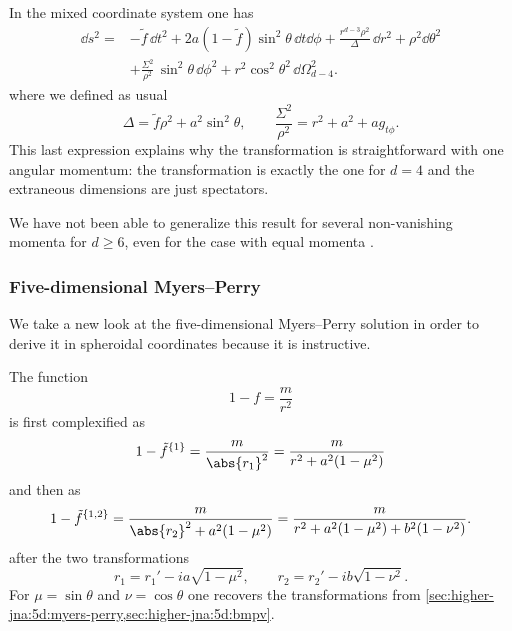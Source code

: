 In the mixed coordinate system one has~\cite{Xu:1988:ExactSolutionsEinstein, Aliev:2006:RotatingBlackHoles}
\begin{equation}
	\begin{aligned}
		\dd s^2 = &- \tilde f\, \dd t^2
			+ 2 a (1 - \tilde f) \sin^2 \theta\, \dd t \dd\phi
			+ \frac{r^{d-3} \rho^2}{\Delta}\, \dd r^2 + \rho^2 \dd\theta^2 \\
			&+ \frac{\Sigma^2}{\rho^2}\, \sin^2 \theta\, \dd\phi^2
			+ r^2 \cos^2 \theta^2\, \dd\Omega_{d-4}^2.
	\end{aligned}
\end{equation} 
where we defined as usual
\begin{equation}
	\Delta = \tilde f \rho^2 + a^2 \sin^2 \theta, \qquad
	\frac{\Sigma^2}{\rho^2} = r^2 + a^2 + a g_{t\phi}.
\end{equation} 
This last expression explains why the transformation is straightforward with one angular momentum: the transformation is exactly the one for $d = 4$ and the extraneous dimensions are just spectators.

We have not been able to generalize this result for several non-vanishing momenta for $d \ge 6$, even for the case with equal momenta .


\subsubsection{Five-dimensional Myers--Perry}
\label{sec:higher-jna:examples:myers-perry-5d}


We take a new look at the five-dimensional Myers--Perry solution in order to derive it in spheroidal coordinates because it is instructive.

The function
\begin{equation}
	1 - f = \frac{m}{r^2}
\end{equation} 
is first complexified as
\begin{equation}
	1 - \tilde f^{\{1\}} = \frac{m}{\abs{r_1}^2}
		= \frac{m}{r^2 + a^2 (1 - \mu^2)}
\end{equation}
and then as 
\begin{equation}
	1 - \tilde f^{\{1, 2\}} = \frac{m}{\abs{r_2}^2 + a^2 (1 - \mu^2)}
		= \frac{m}{r^2 + a^2 (1 - \mu^2) + b^2 (1 - \nu^2)}.
\end{equation}
after the two transformations
\begin{equation}
	r_1 = r_1' - i a \sqrt{1 - \mu^2}, \qquad
	r_2 = r_2' - i b \sqrt{1 - \nu^2}.
\end{equation} 
For $\mu = \sin \theta$ and $\nu = \cos \theta$ one recovers the transformations from \cref{sec:higher-jna:5d:myers-perry,sec:higher-jna:5d:bmpv}.

